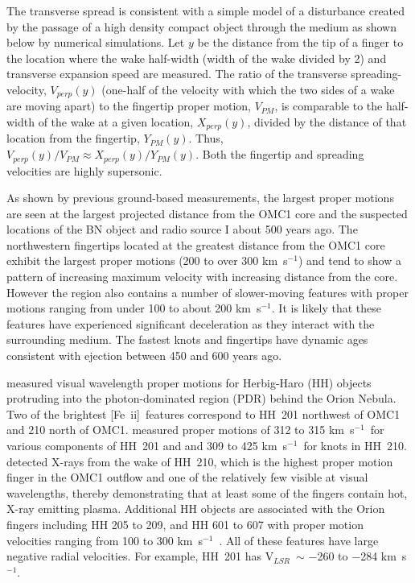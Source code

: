 \documentclass{aa}
\newcommand{\kms}{km~s{$^{-1}$}}
\newcommand{\Feii}{[Fe~{\sc ii}]}
\newcommand{\Vlsr}{V$_{LSR}$}
\begin{document}
The transverse spread is consistent with a simple  model of a disturbance created by the  
passage of a high density  compact object through the medium as shown below 
by numerical simulations.  
Let $y$ be the distance from the tip of a finger to the location where the wake half-width
(width of the wake divided by 2)  and transverse expansion speed are measured.  
The ratio of the transverse spreading-velocity, $V_{perp}(y)$ (one-half  of the velocity 
with which the two sides of a wake are moving apart) to  the fingertip 
proper motion, $V_{PM}$, is  comparable to the half-width of the wake at a given location,  
$X_{perp}(y) $,  divided by the distance of that location from the fingertip, $Y_{PM}(y)$.  
Thus, $V_{perp} (y) / V_{PM} \approx  X_{perp}(y) / Y_{PM}(y)$.     Both the fingertip
and spreading velocities are highly supersonic. 

As shown by previous ground-based measurements, the largest proper motions are seen
at the largest projected distance from the OMC1 core and the suspected locations of
the BN object and radio source I about 500 years ago.   The northwestern fingertips   
located at the greatest distance from the OMC1 core exhibit the largest 
proper motions (200 to over 300 \kms ) and tend to show a pattern of
increasing maximum  velocity with increasing distance from the core.     However 
the region also contains a number of slower-moving features with proper motions
ranging from under 100 to about 200 \kms .    It is likely that these features have
experienced significant deceleration as they interact with the surrounding medium. 
The fastest knots and fingertips have dynamic ages consistent with ejection between 
450 and 600 years ago.

\citet{Doi2002}  measured visual
wavelength proper motions for Herbig-Haro (HH) objects protruding into the 
photon-dominated region (PDR) behind the Orion Nebula.    Two of the brightest \Feii\ features
correspond to HH~201 northwest of OMC1 and 210 north of OMC1.    \citet{Doi2002}
measured proper motions of 312 to 315 \kms\ for various components of HH~201 and
and 309 to 425 \kms\ for knots in HH~210.     \citet{Grosso2006} detected X-rays from the 
wake of  HH~210, which is the highest proper motion finger  in the OMC1 outflow and one 
of the relatively few visible at visual 
wavelengths, thereby demonstrating that at least some of the fingers contain hot,  X-ray 
emitting plasma.   Additional HH objects are associated with the Orion fingers including
HH 205 to 209, and HH 601 to 607  with proper motion velocities ranging  from  100 to 
300 \kms\  \citep{Doi2002}.  All of these features have large negative radial velocities.
For example, HH~201 has \Vlsr\ $\sim$ $-$260 to $-$284 \kms  \citep{Doi2004}.
\end{document}
